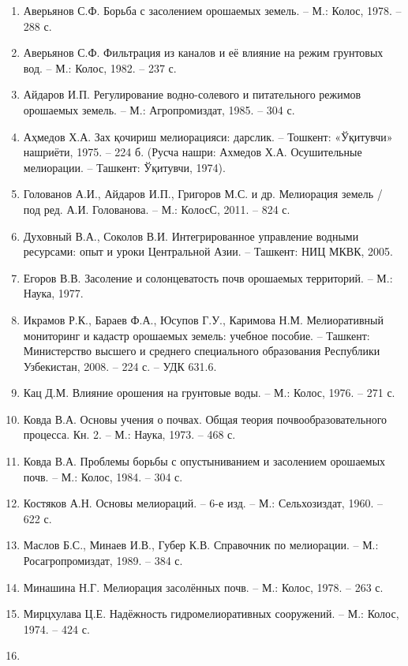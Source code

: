 \documentclass[14pt,a4paper,oneside]{extreport}
\begin{document}
\begin{enumerate}
\def\labelenumi{\arabic{enumi}.}
\setcounter{enumi}{8}
\item
  Аверьянов С.Ф. Борьба с засолением орошаемых земель. -- М.: Колос,
  1978. -- 288 с.
\item
  Аверьянов С.Ф. Фильтрация из каналов и её влияние на режим грунтовых
  вод. -- М.: Колос, 1982. -- 237 с.
\item
  Айдаров И.П. Регулирование водно-солевого и питательного режимов
  орошаемых земель. -- М.: Агропромиздат, 1985. -- 304 с.
\item
  Аҳмедов Х.А. Зах қочириш мелиорацияси: дарслик. -- Тошкент: «Ўқитувчи»
  нашриёти, 1975. -- 224 б. (Русча нашри: Ахмедов Х.А. Осушительные
  мелиорации. -- Ташкент: Ўқитувчи, 1974).
\item
  Голованов А.И., Айдаров И.П., Григоров М.С. и др. Мелиорация земель /
  под ред. А.И. Голованова. -- М.: КолосС, 2011. -- 824 с.
\item
  Духовный В.А., Соколов В.И. Интегрированное управление водными
  ресурсами: опыт и уроки Центральной Азии. -- Ташкент: НИЦ МКВК, 2005.
\item
  Егоров В.В. Засоление и солонцеватость почв орошаемых территорий. --
  М.: Наука, 1977.
\item
  Икрамов Р.К., Бараев Ф.А., Юсупов Г.У., Каримова Н.М. Мелиоративный
  мониторинг и кадастр орошаемых земель: учебное пособие. -- Ташкент:
  Министерство высшего и среднего специального образования Республики
  Узбекистан, 2008. -- 224 с. -- УДК 631.6.
\item
  Кац Д.М. Влияние орошения на грунтовые воды. -- М.: Колос, 1976. --
  271 с.
\item
  Ковда В.А. Основы учения о почвах. Общая теория почвообразовательного
  процесса. Кн. 2. -- М.: Наука, 1973. -- 468 с.
\item
  Ковда В.А. Проблемы борьбы с опустыниванием и засолением орошаемых
  почв. -- М.: Колос, 1984. -- 304 с.
\item
  Костяков А.Н. Основы мелиораций. -- 6-е изд. -- М.: Сельхозиздат,
  1960. -- 622 с.
\item
  Маслов Б.С., Минаев И.В., Губер К.В. Справочник по мелиорации. -- М.:
  Росагропромиздат, 1989. -- 384 с.
\item
  Минашина Н.Г. Мелиорация засолённых почв. -- М.: Колос, 1978. -- 263
  с.
\item
  Мирцхулава Ц.Е. Надёжность гидромелиоративных сооружений. -- М.:
  Колос, 1974. -- 424 с.
\item

\end{enumerate}
\end{document}
